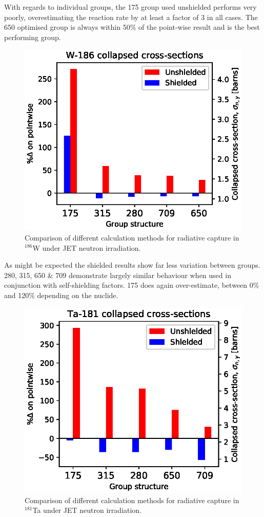 With regards to individual groups, the 175 group used unshielded performs very poorly, overestimating the reaction rate by at least a factor of 3 in all cases. The 650 optimised group is always within 50\% of the point-wise result and is the best performing group.

\begin{figure}[H]
  \centering
  \includegraphics[width=0.8\linewidth]{W-186.eps}
  \caption{Comparison of different calculation methods for radiative capture in $^{186}$W under JET neutron irradiation.}
  \label{fig:tungsten-186}
\end{figure}

As might be expected the shielded results show far less variation between groups. 280, 315, 650 \& 709 demonstrate largely similar behaviour when used in conjunction with self-shielding factors. 175 does again over-estimate, between 0\% and 120\% depending on the nuclide.

\begin{figure}[H]
  \centering
  \includegraphics[width=0.8\linewidth]{Ta-181.eps}
  \caption{Comparison of different calculation methods for radiative capture in $^{181}$Ta under JET neutron irradiation.}
  \label{fig:tantalum-181}
\end{figure}


